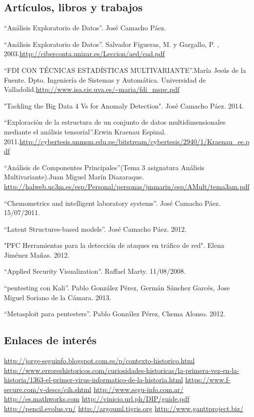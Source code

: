 
\subsection{Artículos, libros y trabajos}
 ``Análisis Exploratorio de Datos''. José Camacho Páez.

 ``Análisis Exploratorio de Datos''. Salvador Figueras, M. y Gargallo, P. , 2003.\url{http://ciberconta.unizar.es/Leccion/aed/ead.pdf}

 ``FDI CON TÉCNICAS ESTADÍSTICAS MULTIVARIANTE''.María Jesús de la Fuente. Dpto. Ingeniería de Sistemas y Automática. Universidad de Valladolid.\url{http://www.isa.cie.uva.es/~maria/fdi_mspc.pdf}

 "Tackling the Big Data 4 Vs for Anomaly Detection". José Camacho Páez. 2014.

 ``Exploración de la estructura de un conjunto de datos multidimensionales mediante el análisis tensorial''.Erwin Kraenau Espinal. 2011.\url{http://cybertesis.unmsm.edu.pe/bitstream/cybertesis/2940/1/Kraenau_ee.pdf}

 ``Análisis de Componentes Principales''(Tema 3 asignatura Análisis Multivariante).Juan Miguel Marín Diazaraque. \url{http://halweb.uc3m.es/esp/Personal/personas/jmmarin/esp/AMult/tema3am.pdf}

 ``Chemometrics and intelligent laboratory systems''. José Camacho Páez. 15/07/2011. 

 ``Latent Structures-based models''. José Camacho Páez. 2012.

 "PFC Herramientas para la detección de ataques en tráfico de red". Elena Jiménez Mañas. 2012.

 ``Applied Security Visualization''. Raffael Marty. 11/08/2008.

 “pentesting con Kali”. Pablo González Pérez, Germán Sánchez Garcés, Jose Miguel Soriano de la Cámara. 2013.

 “Metasploit para pentesters”. Pablo González Pérez, Chema Alonso. 2012.


\subsection{Enlaces de interés}
 \url{http://jorge-seguinfo.blogspot.com.es/p/contexto-historico.html}
 \url{http://www.erroreshistoricos.com/curiosidades-historicas/la-primera-vez-en-la-historia/1363-el-primer-virus-informatico-de-la-historia.html}
 \url{https://www.f-secure.com/v-descs/cih.shtml}
 \url{http://www.segu-info.com.ar/}
 \url{ http://es.mathworks.com}
 \url{http://vinicio.url.ph/DIP/guide.pdf}
 \url{http://pencil.evolus.vn/}
 \url{http://argouml.tigris.org}
 \url{http://www.ganttproject.biz/}
